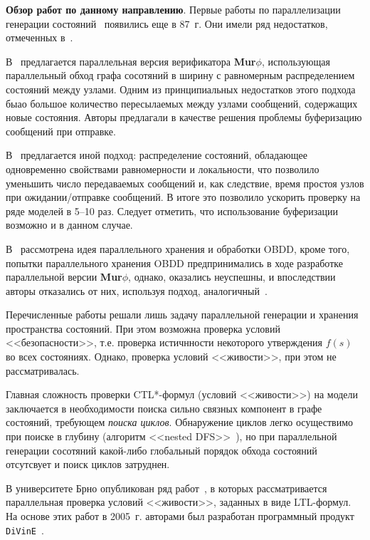 \documentclass[a4paper,notitlepage,14pt]{article}
\begin{document}
\textbf{Обзор работ по данному направлению}. Первые работы по параллелизации
генерации состояний~\cite{Aggarwal87} появились еще в 87~г. Они имели ряд недостатков,
отмеченных в~\cite{Stern97parallelizingthe}.

В~\cite{Stern97parallelizingthe} предлагается параллельная версия верификатора
\textbf{Mur$\phi$}, использующая параллельный обход графа сосотяний в ширину с равномерным
распределением состояний между узлами. Одним из принципиальных недостатков этого подхода
быао большое количество пересылаемых между узлами сообщений, содержащих новые
состояния. Авторы предлагали в качестве решения проблемы буферизацию сообщений при
отправке.

В~\cite{LS99} предлагается иной подход: распределение состояний, обладающее одновременно
свойствами равномерности и локальности, что позволило уменьшить число передаваемых
сообщений и, как следствие, время простоя узлов при ожидании/отправке сообщений. В итоге
это позволило ускорить проверку на ряде моделей в 5--10 раз. Следует отметить, что
использование буферизации возможно и в данном случае.

В~\cite{McMillan92} рассмотрена идея параллельного хранения и обработки OBDD, кроме того,
попытки параллельного хранения OBDD предпринимались в ходе разработке параллельной версии
\textbf{Mur$\phi$}, однако, оказались неуспешны, и впоследствии авторы отказались от них,
используя подход, аналогичный~\cite{LS99}.

Перечисленные работы решали лишь задачу параллельной генерации и хранения пространства
состояний. При этом возможна проверка условий <<безопасности>>, т.е. проверка истичнности
некоторого утверждения $f(s)$ во всех состояниях. Однако, проверка условий <<живости>>,
при этом не рассматривалась.

Главная сложность проверки CTL*-формул (условий <<живости>>) на модели заключается в
необходимости поиска сильно связных компонент в графе состояний, требующем \emph{поиска
  циклов}. Обнаружение циклов легко осуществимо при поиске в глубину (алгоритм <<nested
DFS>>~\cite{DBLP:conf/spin/FaragoS09}), но при параллельной генерации сосотяний какой-либо
глобальный порядок обхода состояний отсутсвует и поиск циклов затруднен.

В университете Брно опубликован ряд работ~\cite{DLTL1,DLTL2}, в которых рассматривается
параллельная проверка условий <<живости>>, заданных в виде LTL-формул. На основе этих
работ в 2005~г. авторами был разработан программный продукт \texttt{DiVinE}~\cite{DiVinE}.
\end{document}
